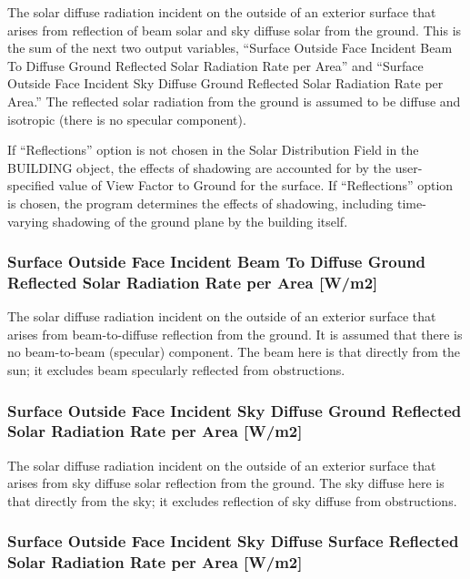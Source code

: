 The solar diffuse radiation incident on the outside of an exterior surface that arises from reflection of beam solar and sky diffuse solar from the ground. This is the sum of the next two output variables, ``Surface Outside Face Incident Beam To Diffuse Ground Reflected Solar Radiation Rate per Area'' and ``Surface Outside Face Incident Sky Diffuse Ground Reflected Solar Radiation Rate per Area.'' The reflected solar radiation from the ground is assumed to be diffuse and isotropic (there is no specular component).

If ``Reflections'' option is not chosen in the Solar Distribution Field in the BUILDING object, the effects of shadowing are accounted for by the user-specified value of View Factor to Ground for the surface. If ``Reflections'' option is chosen, the program determines the effects of shadowing, including time-varying shadowing of the ground plane by the building itself.

\subsubsection{Surface Outside Face Incident Beam To Diffuse Ground Reflected Solar Radiation Rate per Area {[}W/m2{]}}\label{surface-outside-face-incident-beam-to-diffuse-ground-reflected-solar-radiation-rate-per-area-wm2}

The solar diffuse radiation incident on the outside of an exterior surface that arises from beam-to-diffuse reflection from the ground. It is assumed that there is no beam-to-beam (specular) component. The beam here is that directly from the sun; it excludes beam specularly reflected from obstructions.

\subsubsection{Surface Outside Face Incident Sky Diffuse Ground Reflected Solar Radiation Rate per Area {[}W/m2{]}}\label{surface-outside-face-incident-sky-diffuse-ground-reflected-solar-radiation-rate-per-area-wm2}

The solar diffuse radiation incident on the outside of an exterior surface that arises from sky diffuse solar reflection from the ground. The sky diffuse here is that directly from the sky; it excludes reflection of sky diffuse from obstructions.

\subsubsection{Surface Outside Face Incident Sky Diffuse Surface Reflected Solar Radiation Rate per Area {[}W/m2{]}}\label{surface-outside-face-incident-sky-diffuse-surface-reflected-solar-radiation-rate-per-area-wm2}

